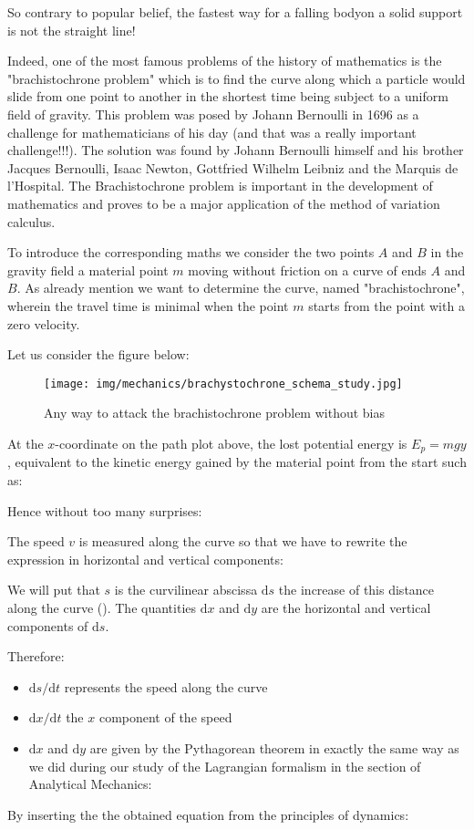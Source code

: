 	So contrary to popular belief, the fastest way for a falling bodyon a solid support is not the straight line!

	Indeed, one of the most famous problems of the history of mathematics is the "brachistochrone problem" which is to find the curve along which a particle would slide from one point to another in the shortest time being subject to a uniform field of gravity. This problem was posed by Johann Bernoulli in 1696 as a challenge for mathematicians of his day (and that was a really important challenge!!!). The solution was found by Johann Bernoulli himself and his brother Jacques Bernoulli, Isaac Newton, Gottfried Wilhelm  Leibniz and the Marquis de l'Hospital. The Brachistochrone  problem is important in the development of mathematics and proves to be a major application of the method of variation calculus.

	To introduce the corresponding maths we consider the two points $A$ and $B$ in the gravity field a material point $m$ moving without friction on a curve of ends $A$ and $B$. As already mention we want to determine the curve, named "brachistochrone", wherein the travel time is minimal when the point $m$ starts from the point with a zero velocity.

	Let us consider the figure below:
	\begin{figure}[H]
		\centering
		\texttt{[image: img/mechanics/brachystochrone\_schema\_study.jpg]}
		\caption{Any way to attack the brachistochrone problem without bias}
	\end{figure}
	At the $x$-coordinate on the path plot above, the lost potential energy is $E_p=mgy$, equivalent to the kinetic energy gained by the material point from the start such as:
	
	Hence without too many surprises:
	
	The speed $v$ is measured along the curve so that we have to rewrite the expression in horizontal and vertical components:

	We will put that $s$ is the curvilinear abscissa $\mathrm{d}s$ the increase of this distance along the curve (). The quantities $\mathrm{d}x$ and  $\mathrm{d}y$ are the horizontal and vertical components of $\mathrm{d}s$.

	Therefore:
	\begin{itemize}
		\item $\mathrm{d}s/\mathrm{d}t$ represents the speed along the curve

		\item  $\mathrm{d}x/\mathrm{d}t$ the $x$ component of the speed

		\item $\mathrm{d}x$ and $\mathrm{d}y$ are given by the Pythagorean theorem in exactly the same way as we did during our study of the Lagrangian formalism in the section of Analytical Mechanics:
		
	\end{itemize}
	By inserting the the obtained equation from the principles of dynamics:
	
